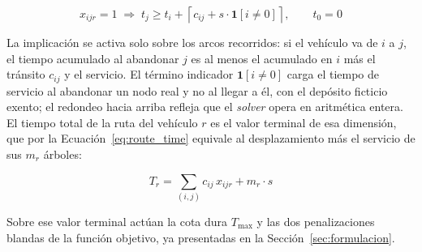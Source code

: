\begin{equation}
  x_{ijr} = 1 \;\Longrightarrow\; t_j \geq t_i + \left\lceil c_{ij} + s\cdot\mathbf{1}[i \neq 0]
  \right\rceil,
  \qquad t_0 = 0
  \label{eq:dimension-tiempo}
\end{equation}

La implicación se activa solo sobre los arcos recorridos: si el vehículo va de $i$ a $j$, el tiempo
acumulado al abandonar $j$ es al menos el acumulado en $i$ más el tránsito $c_{ij}$ y el servicio.
El término indicador $\mathbf{1}[i \neq 0]$ carga el tiempo de servicio al abandonar un nodo real y
no al llegar a él, con el depósito ficticio exento; el redondeo hacia arriba refleja que el
\textit{solver} opera en aritmética entera. El tiempo total de la ruta del vehículo $r$ es el valor
terminal de esa dimensión, que por la Ecuación~\ref{eq:route_time} equivale al desplazamiento más
el servicio de sus $m_r$ árboles:

\begin{equation}
  T_r = \sum_{(i,j)} c_{ij}\,x_{ijr} + m_r \cdot s
  \label{eq:route_time}
\end{equation}

Sobre ese valor terminal actúan la cota dura $T_{\max}$ y las dos penalizaciones blandas de la
función objetivo, ya presentadas en la Sección~\ref{sec:formulacion}.
